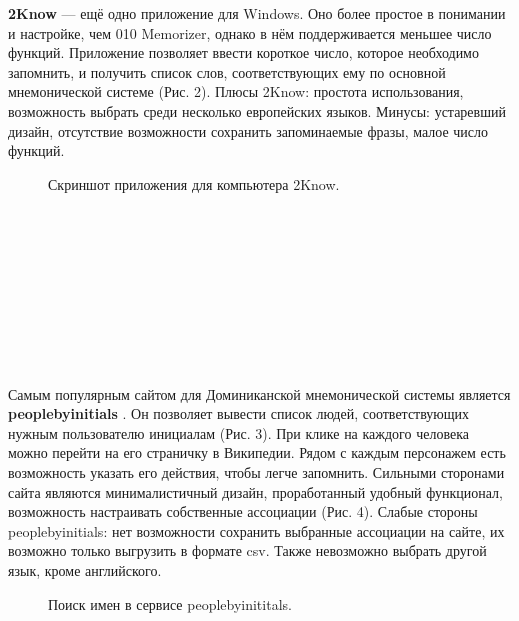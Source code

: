\documentclass[draft]{article}
\begin{document}
\textbf{2Know} \cite{litlink7} — ещё одно приложение для Windows. Оно более простое в понимании и настройке, чем 010 Memorizer, однако в нём поддерживается меньшее число функций. Приложение позволяет ввести короткое число, которое необходимо запомнить, и получить список слов, соответствующих ему по основной мнемонической системе (Рис. 2). Плюсы 2Know: простота использования, возможность выбрать среди несколько европейских языков. Минусы: устаревший дизайн, отсутствие возможности сохранить запоминаемые фразы, малое число функций.\\
\begin{figure}[h]
\caption{Скриншот приложения для компьютера 2Know.}
\label{ris:image}
\end{figure}\\
~\\
~\\
~\\
~\\
~\\
~\\
~\\
~\\
Самым популярным сайтом для Доминиканской мнемонической системы является \textbf{peoplebyinitials} \cite{litlink8}. Он позволяет вывести список людей, соответствующих нужным пользователю инициалам (Рис. 3). При клике на каждого человека можно перейти на его страничку в Википедии. Рядом с каждым персонажем есть возможность указать его действия, чтобы легче запомнить. Сильными сторонами сайта являются минималистичный дизайн, проработанный удобный функционал, возможность настраивать собственные ассоциации (Рис. 4). Слабые стороны peoplebyinitials: нет возможности сохранить выбранные ассоциации на сайте, их возможно только выгрузить в формате csv. Также невозможно выбрать другой язык, кроме английского.\\
\begin{figure}[h]
\caption{Поиск имен в сервисе peoplebyinititals.}
\label{ris:image}
\end{figure}\\
\end{document}
